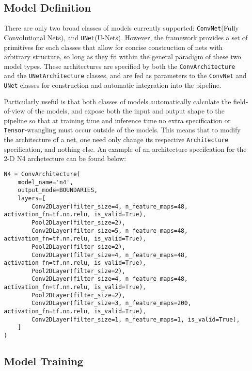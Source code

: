 \subsection{Model Definition}

There are only two broad classes of models currently supported: \texttt{ConvNet}(Fully Convolutional Nets), and \texttt{UNet}(U-Nets). However, the framework provides a set of primitives for each classes that allow for concise construction of nets with arbitrary structure, so long as they fit within the general paradigm of these two model types. These architectures are specified by both the \texttt{ConvArchitecture} and the \texttt{UNetArchitecture} classes, and are fed as parameters to the \texttt{ConvNet} and \texttt{UNet} classes for construction and automatic integration into the pipeline.

Particularly useful is that both classes of models automatically calculate the field-of-view of the models, and expose both the input and output shape to the pipeline so that at training time and inference time no extra specification or \texttt{Tensor}-wrangling must occur outside of the models. This means that to modify the architecture of a net, one need only change its respective \texttt{Architecture} specification, and nothing else. An example of an architecture specifcation for the 2-D N4 archetecture can be found below:

\begin{lstlisting}
N4 = ConvArchitecture(
    model_name='n4',
    output_mode=BOUNDARIES,
    layers=[
        Conv2DLayer(filter_size=4, n_feature_maps=48, activation_fn=tf.nn.relu, is_valid=True),
        Pool2DLayer(filter_size=2),
        Conv2DLayer(filter_size=5, n_feature_maps=48, activation_fn=tf.nn.relu, is_valid=True),
        Pool2DLayer(filter_size=2),
        Conv2DLayer(filter_size=4, n_feature_maps=48, activation_fn=tf.nn.relu, is_valid=True),
        Pool2DLayer(filter_size=2),
        Conv2DLayer(filter_size=4, n_feature_maps=48, activation_fn=tf.nn.relu, is_valid=True),
        Pool2DLayer(filter_size=2),
        Conv2DLayer(filter_size=3, n_feature_maps=200, activation_fn=tf.nn.relu, is_valid=True),
        Conv2DLayer(filter_size=1, n_feature_maps=1, is_valid=True),
    ]
)
\end{lstlisting}

\subsection{Model Training}

